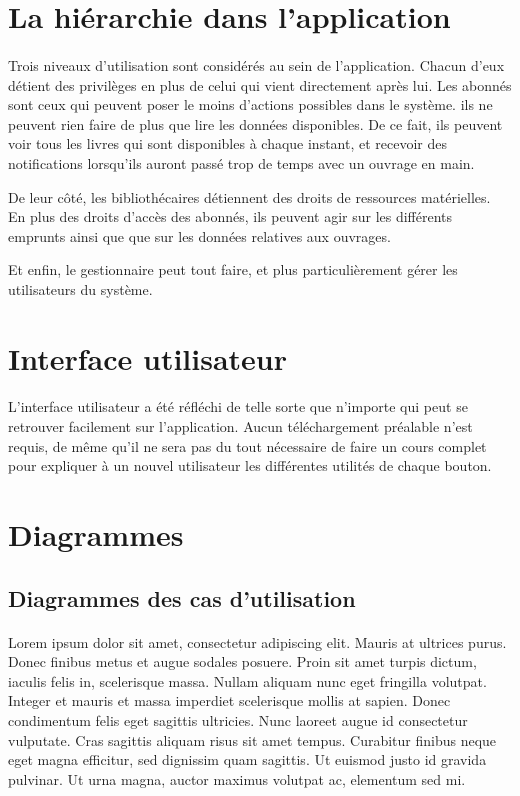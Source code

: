 \section{La hiérarchie dans l'application}
\paragraph{}
Trois niveaux d'utilisation sont considérés au sein de l'application.
Chacun d'eux détient des privilèges en plus de celui qui vient directement après lui.
Les abonnés sont ceux qui peuvent poser le moins d'actions possibles dans le système. ils 
ne peuvent rien faire de plus que lire les données disponibles. De ce fait, 
ils peuvent voir tous les livres qui sont disponibles à chaque instant, et recevoir 
des notifications lorsqu'ils auront passé trop de temps avec un ouvrage en main.\par 
De leur côté, les bibliothécaires détiennent des droits de ressources matérielles. En plus
des droits d'accès des abonnés, ils peuvent agir sur les différents 
emprunts ainsi que que sur les données relatives aux ouvrages. \par 
Et enfin, le gestionnaire peut tout faire, et plus particulièrement gérer les 
utilisateurs du système.
\section{Interface utilisateur}
\paragraph{}       
L'interface utilisateur a été réfléchi de telle sorte que n'importe qui 
peut se retrouver facilement sur l'application. Aucun téléchargement préalable n'est requis, de même 
qu'il ne sera pas du tout nécessaire de faire un cours complet pour expliquer à un nouvel utilisateur
les différentes utilités de chaque bouton.

\section{Diagrammes}
\subsection{Diagrammes des cas d'utilisation}
\paragraph{} 
Lorem ipsum dolor sit amet, consectetur adipiscing elit. Mauris at ultrices purus. Donec finibus metus et augue sodales posuere. Proin sit amet turpis dictum, iaculis felis in, scelerisque massa. Nullam aliquam nunc eget fringilla volutpat. Integer et mauris et massa imperdiet scelerisque mollis at sapien. Donec condimentum felis eget sagittis ultricies. Nunc laoreet augue id consectetur vulputate. Cras sagittis aliquam risus sit amet tempus. Curabitur finibus neque eget magna efficitur, sed dignissim quam sagittis. Ut euismod justo id gravida pulvinar. Ut urna magna, auctor maximus volutpat ac, elementum sed mi.
